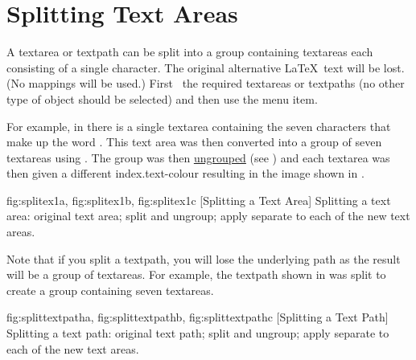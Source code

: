 
\section{Splitting Text Areas}\label{sec:splittext}


A \gls{textarea} or \gls{textpath} can be split into a \gls{group}
containing \glspl{textarea} each consisting of a single character.
The original alternative \LaTeX\ text will be lost. (No mappings
will be used.) First \select\ the required \glspl{textarea} or
\glspl{textpath} (no other type of \gls{object} should be selected)
and then use the  menu item.

For example, in  there is a single 
\gls{textarea} containing the seven characters that make up the word
.  This text area was then converted into a group of
seven \glspl*{textarea} using . The group was
then \hyperref[sec:grouping]{ungrouped} (see ) 
and each \gls{textarea} was then given a different
\gls{index.text-colour} resulting in the image
shown in .

{
  {fig:splitex1a}{}{},
  {fig:splitex1b}{}{},
  {fig:splitex1c}{}{}
} 
[Splitting a Text Area]
{Splitting a text area:
 original text area;
 split and ungroup;
 apply separate  
to each of the new text areas.}

Note that if you split a \gls*{textpath}, you will lose the
underlying path as the result will be a group of \glspl{textarea}.
For example, the \gls*{textpath} shown in
 was split to create a group
containing seven \glspl*{textarea}.

{
  {fig:splittextpatha}{}{},
  {fig:splittextpathb}{}{},
  {fig:splittextpathc}{}{}
}
[Splitting a Text Path]
{Splitting a text path:
 original text path;
 split and ungroup;
 apply
separate  to each of the new text areas.}


